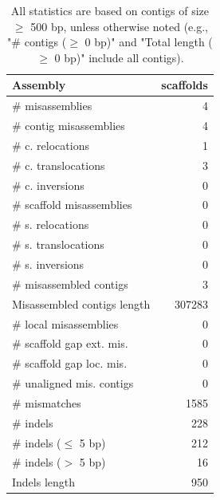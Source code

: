 \documentclass[12pt,a4paper]{article}
\begin{document}
\begin{table}[ht]
\begin{center}
\caption{All statistics are based on contigs of size $\geq$ 500 bp, unless otherwise noted (e.g., "\# contigs ($\geq$ 0 bp)" and "Total length ($\geq$ 0 bp)" include all contigs).}
\begin{tabular}{|l*{1}{|r}|}
\hline
Assembly & scaffolds \\ \hline
\# misassemblies & 4 \\ \hline
\hspace{2mm}\# contig misassemblies & 4 \\ \hline
\hspace{5mm}\# c. relocations & 1 \\ \hline
\hspace{5mm}\# c. translocations & 3 \\ \hline
\hspace{5mm}\# c. inversions & 0 \\ \hline
\hspace{2mm}\# scaffold misassemblies & 0 \\ \hline
\hspace{5mm}\# s. relocations & 0 \\ \hline
\hspace{5mm}\# s. translocations & 0 \\ \hline
\hspace{5mm}\# s. inversions & 0 \\ \hline
\# misassembled contigs & 3 \\ \hline
Misassembled contigs length & 307283 \\ \hline
\# local misassemblies & 0 \\ \hline
\# scaffold gap ext. mis. & 0 \\ \hline
\# scaffold gap loc. mis. & 0 \\ \hline
\# unaligned mis. contigs & 0 \\ \hline
\# mismatches & 1585 \\ \hline
\# indels & 228 \\ \hline
\hspace{5mm}\# indels ($\leq$ 5 bp) & 212 \\ \hline
\hspace{5mm}\# indels ($>$ 5 bp) & 16 \\ \hline
Indels length & 950 \\ \hline
\end{tabular}
\end{center}
\end{table}
\end{document}
